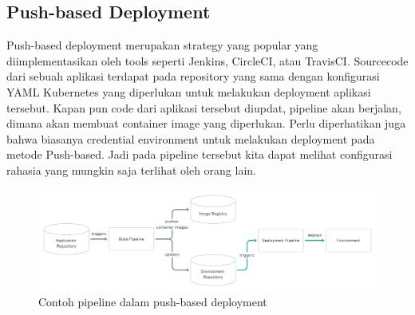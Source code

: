 \subsection{Push-based Deployment}
Push-based deployment \cite{GitOps} merupakan strategy yang popular yang diimplementasikan oleh
tools seperti Jenkins, CircleCI, atau TravisCI.
Sourcecode dari sebuah aplikasi terdapat pada repository yang sama dengan konfigurasi YAML Kubernetes yang diperlukan untuk melakukan deployment aplikasi tersebut.
Kapan pun code dari aplikasi tersebut diupdat, pipeline akan berjalan, dimana akan membuat container image yang diperlukan.
Perlu diperhatikan juga bahwa biasanya credential environment untuk melakukan deployment pada metode Push-based. Jadi pada pipeline tersebut kita dapat melihat
configurasi rahasia yang mungkin saja terlihat oleh orang lain.
\begin{figure}[ht]
    \centering
    \includegraphics[width=1\textwidth]{figures/push-based.png}
    \caption{Contoh pipeline dalam push-based deployment}
\end{figure}
\newpage
\vspace{0.5cm}
